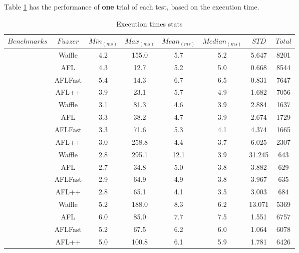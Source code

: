 Table \ref{table:all-exe} has the performance of \textbf{one} trial of each test, based on the execution time. 

\begin{table}[!t]
    \begin{adjustbox}{angle=90}
        {\setlength{\extrarowheight}{1ex}%
        \begin{tabular}{|c|c|c|c|c|c|c|c|} 
            \hline
            $Benchmarks$   & $Fuzzer$ & $Min_{(ms)}$ & $Max_{(ms)}$ & $Mean_{(ms)}$ & $Median_{(ms)}$ & $STD$ & $Total$ \\
            \hline
            \rowcolor{gray!20} \multirow{4}{*}{freetype} 
            & Waffle & 4.2 & 155.0 & 5.7 & 5.2 & 5.647 & 8201\\ \cline{2-8}
            & AFL & 4.3 & 12.7 & 5.2 & 5.0 & 0.668 & 8544 \\ \cline{2-8}
            & AFLFast & 5.4 & 14.3 & 6.7 & 6.5 & 0.831 & 7647 \\ \cline{2-8}
            & AFL++ & 3.9 & 23.1 & 5.7 & 4.9 & 1.682 & 7056 \\ \cline{2-8}
            \hline
            \rowcolor{gray!20} \multirow{4}{*}{libjpeg}
            & Waffle   & 3.1 & 81.3 & 4.6 & 3.9 & 2.884 & 1637 \\ \cline{2-8}
            & AFL   & 3.3 & 38.2 & 4.7 & 3.9 & 2.674 & 1729 \\ \cline{2-8}
            & AFLFast   & 3.3 & 71.6 & 5.3 & 4.1 & 4.374 & 1665 \\ \cline{2-8}
            & AFL++   & 3.0 & 258.8 & 4.4 & 3.7 & 6.025 & 2307 \\ \cline{2-8}
            \hline
            \rowcolor{gray!20} \multirow{4}{*}{libpng}
            & Waffle    & 2.8 & 295.1 & 12.1 & 3.9 & 31.245 & 643 \\ \cline{2-8}
            & AFL    & 2.7 & 34.8 & 5.0 & 3.8 & 3.882 & 629 \\ \cline{2-8}
            & AFLFast    & 2.9 & 64.9 & 4.9 & 3.8 & 3.967 & 635 \\ \cline{2-8}
            & AFL++    & 2.8 & 65.1 & 4.1 & 3.5 & 3.003 & 684 \\ \cline{2-8}
            \hline
            \rowcolor{gray!20} \multirow{4}{*}{libxml} 
            & Waffle    & 5.2 & 188.0 & 8.3 & 6.2 & 13.071 & 5369 \\ \cline{2-8}
            & AFL    & 6.0 & 85.0 & 7.7 & 7.5 & 1.551 & 6757 \\ \cline{2-8}
            & AFLFast    & 5.2 & 67.5 & 6.2 & 6.0 & 1.064 & 6078 \\ \cline{2-8}
            & AFL++    & 5.0 & 100.8 & 6.1 & 5.9 & 1.781 & 6426 \\ \cline{2-8}
            \hline
        \end{tabular}
        }
    \end{adjustbox}
    \caption{Execution times stats}
    \label{table:all-exe}
\end{table}
